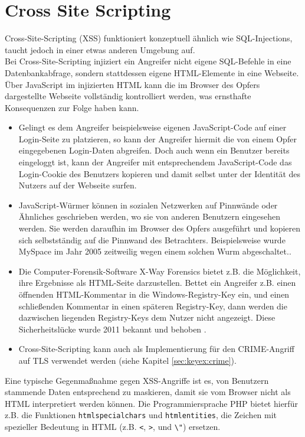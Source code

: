 \section{Cross Site Scripting}
Cross-Site-Scripting (XSS) funktioniert konzeptuell ähnlich wie SQL-Injections, taucht jedoch in einer etwas anderen Umgebung auf.\\

Bei Cross-Site-Scripting injiziert ein Angreifer nicht eigene SQL-Befehle in eine Datenbankabfrage,
sondern stattdessen eigene HTML-Elemente in eine Webseite.
Über JavaScript im injizierten HTML kann die im Browser des Opfers dargestellte Webseite vollständig kontrolliert werden, was
ernsthafte Konsequenzen zur Folge haben kann.
\begin{itemize}
	\item Gelingt es dem Angreifer beispielsweise eigenen JavaScript-Code auf einer Login-Seite zu platzieren, so kann der Angreifer hiermit die von einem Opfer eingegebenen Login-Daten abgreifen.
Doch auch wenn ein Benutzer bereits eingeloggt ist, kann der Angreifer mit entsprechendem JavaScript-Code das Login-Cookie des Benutzers kopieren und damit selbst unter der Identität des Nutzers auf der Webseite surfen.
	\item JavaScript-Würmer können in sozialen Netzwerken auf Pinnwände oder Ähnliches geschrieben werden, wo sie von anderen Benutzern eingesehen werden. Sie werden daraufhin im Browser des Opfers ausgeführt und kopieren sich selbstständig auf die Pinnwand des Betrachters.
Beispielsweise wurde MySpace im Jahr 2005 zeitweilig wegen einem solchen Wurm abgeschaltet.\cite{Kamkar2005, Sophos}.
	\item Die Computer-Forensik-Software X-Way Forensics bietet z.B. die Möglichkeit, ihre Ergebnisse als HTML-Seite darzustellen.
Bettet ein Angreifer z.B. einen öffnenden HTML-Kommentar in die Windows-Registry-Key ein, und einen schließenden Kommentar in einen späteren Registry-Key, dann werden die dazwischen liegenden Registry-Keys dem Nutzer nicht angezeigt.
Diese Sicherheitslücke wurde 2011 bekannt und behoben \cite{Wundram2011}.
	\item Cross-Site-Scripting kann auch als Implementierung für den CRIME-Angriff auf TLS verwendet werden (siehe Kapitel \ref{sec:keyex:crime}).
\end{itemize}

Eine typische Gegenmaßnahme gegen XSS-Angriffe ist es, von Benutzern stammende Daten entsprechend zu maskieren, damit sie vom Browser nicht als HTML interpretiert werden können.
Die Programmiersprache PHP bietet hierfür z.B. die Funktionen \lstinline+htmlspecialchars+ und \lstinline+htmlentities+, die Zeichen mit spezieller Bedeutung in HTML (z.B. \lstinline+<+, \lstinline+>+, und \lstinline+\"+) ersetzen.

